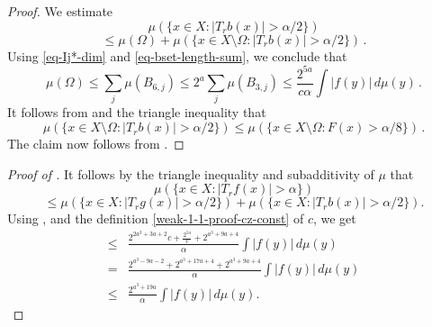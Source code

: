 \documentclass[10pt,a4paper]{article}
\theoremstyle{plain}
\theoremstyle{definition}
\numberwithin{equation}{subsection}
\newcommand{\proves}[1]{}
\newcommand{\leanok}{}
\begin{document}
\begin{proof}
    \leanok
    We estimate
    \begin{equation*}
        \mu\left(\{x\in X: |T_r b(x)|>\alpha/2\}\right)
    \end{equation*}
    \begin{equation}
        \label{eq-set-dec-2}
        \le \mu (\Omega) +  \mu\left(\{x\in X\setminus\Omega: |T_r b(x)|>{\alpha}/2\}\right)\,.
    \end{equation}
    Using \eqref{eq-Ij*-dim} and \eqref{eq-bset-length-sum}, we conclude that
    \begin{equation}
        \label{eq-omega-bd}
        \mu(\Omega) \le \sum_{j} \mu (B_{6,j})
        \le 2^a \sum_j \mu(B_{3,j}) \le \frac{2^{5a}}{c\alpha} \int |f(y)|\, d\mu(y)\,.
    \end{equation}
    It follows from  and the triangle inequality that
    \begin{equation}
        \label{eq-set-dec-3}
        \mu({\{x\in X\setminus\Omega: |T_r b(x)|>\alpha/2\}}) \le \mu(\{x\in X\setminus\Omega: F(x)> \alpha/8\})\,.
    \end{equation}
    The claim now follows from .
\end{proof}

\begin{proof}[Proof of ]
\leanok
\proves{calderon-zygmund-weak-1-1}
It follows by the triangle inequality and subadditivity of $\mu$ that
\begin{equation*}
    \mu\left(\{x\in X: |T_r f(x)|>\alpha\}\right)
\end{equation*}
\begin{equation*}
\label{eq-set-dec-1}
 \le \mu\left(\{x\in X: |T_r g(x)|>{\alpha}/2\}\right) +  \mu\left(\{x\in X: |T_r b(x)|>{\alpha}/2\}\right).
\end{equation*}
Using ,  and the definition \eqref{weak-1-1-proof-cz-const} of $c$, we get
\begin{align*}
    \le& \frac{2^{2a^3+3a+2}c + \frac{2^{5a}}{c} + 2^{a^3+9a+4}}{\alpha} \int |f(y)|\, d\mu(y) \\
    =& \frac{2^{a^3-9a-2} + 2^{a^3+17a+4} + 2^{a^3+9a+4}}{\alpha} \int |f(y)|\, d\mu(y) \\
    \le& \frac{2^{a^3 + 19a}}{\alpha} \int |f(y)|\, d\mu(y).
\end{align*}
\end{proof}
\end{document}

